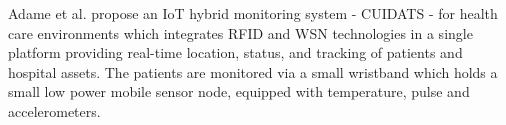 % 
% 
%

Adame et al. \cite{Adame2018} propose an IoT hybrid monitoring system - CUIDATS - for health care environments which integrates RFID and WSN technologies in a single platform providing real-time location, status, and tracking of patients and hospital assets. The patients are monitored via a small wristband which holds a small low power mobile sensor node, equipped with temperature, pulse and accelerometers.


